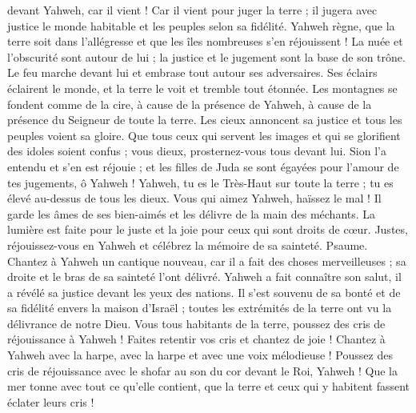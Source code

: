 \begin{multicols}{2}
devant Yahweh, car il vient ! Car il vient pour juger la terre ; il jugera avec justice le monde habitable et les peuples selon sa fidélité.
\VerseOne{}Yahweh règne, que la terre soit dans l'allégresse et que les îles nombreuses s'en réjouissent !
La nuée et l'obscurité sont autour de lui ; la justice et le jugement sont la base de son trône.
Le feu marche devant lui et embrase tout autour ses adversaires.
Ses éclairs éclairent le monde, et la terre le voit et tremble tout étonnée.
Les montagnes se fondent comme de la cire, à cause de la présence de Yahweh, à cause de la présence du Seigneur de toute la terre.
Les cieux annoncent sa justice et tous les peuples voient sa gloire.
Que tous ceux qui servent les images et qui se glorifient des idoles soient confus ; vous dieux, prosternez-vous tous devant lui.
Sion l'a entendu et s'en est réjouie ; et les filles de Juda se sont égayées pour l'amour de tes jugements, ô Yahweh !
Yahweh, tu es le Très-Haut sur toute la terre ; tu es élevé au-dessus de tous les dieux.
Vous qui aimez Yahweh, haïssez le mal ! Il garde les âmes de ses bien-aimés et les délivre de la main des méchants.
La lumière est faite pour le juste et la joie pour ceux qui sont droits de cœur.
Justes, réjouissez-vous en Yahweh et célébrez la mémoire de sa sainteté.
\VerseOne{}Psaume. Chantez à Yahweh un cantique nouveau, car il a fait des choses merveilleuses ; sa droite et le bras de sa sainteté l'ont délivré.
Yahweh a fait connaître son salut, il a révélé sa justice devant les yeux des nations.
Il s'est souvenu de sa bonté et de sa fidélité envers la maison d'Israël ; toutes les extrémités de la terre ont vu la délivrance de notre Dieu.
Vous tous habitants de la terre, poussez des cris de réjouissance à Yahweh ! Faites retentir vos cris et chantez de joie !
Chantez à Yahweh avec la harpe, avec la harpe et avec une voix mélodieuse !
Poussez des cris de réjouissance avec le shofar au son du cor devant le Roi, Yahweh !
Que la mer tonne avec tout ce qu'elle contient, que la terre et ceux qui y habitent fassent éclater leurs cris !

\end{multicols}
